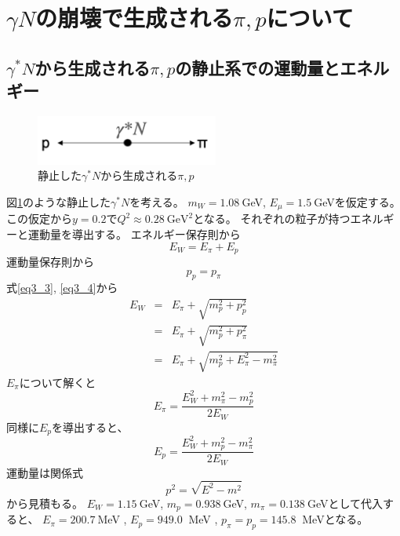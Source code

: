 \section{\texorpdfstring{$\gamma N$の崩壊で生成される$\pi, p$について}{LG}}
\subsection{$\gamma^* N$から生成される$\pi,p$の静止系での運動量とエネルギー}
\begin{figure}[H]
    \centering
    \includegraphics[width=6cm]{img/rest_middle_situation.png}
    \caption{静止した$\gamma^* N$から生成される$\pi,p$}
    \label{fig:angle5}
\end{figure}
図\ref{fig:angle5}のような静止した$\gamma^* N$を考える。
$m_W = 1.08 \ $GeV, $E_\mu = 1.5 \ $GeVを仮定する。
この仮定から$y = 0.2$で$Q^2 \approx 0.28 \ \mathrm{GeV^2}$となる。
それぞれの粒子が持つエネルギーと運動量を導出する。
エネルギー保存則から
\begin{equation}
    \label{eq3_3}
    E_W = E_\pi + E_p
\end{equation}
運動量保存則から
\begin{equation}
    \label{eq3_4}
    p_p = p_\pi
\end{equation}
式\ref{eq3_3}, \ref{eq3_4}から
\begin{eqnarray}
    E_W  & =  & E_\pi + \sqrt{m_p^2 + p_p^2} \\
    & = & E_\pi + \sqrt{m_p^2 + p_\pi^2} \\
    & = & E_\pi + \sqrt{m_p^2 + E_\pi^2 - m_\pi^2}
\end{eqnarray}
$E_\pi$について解くと
\begin{equation}
    E_\pi = \dfrac{E_W ^2 + m_\pi ^2 - m_p ^2}{2E_W}
\end{equation}
同様に$E_p$を導出すると、
\begin{equation}
    E_p = \dfrac{E_W ^2 + m_p ^2 - m_\pi ^2}{2E_W}
\end{equation}
運動量は関係式
\begin{equation}
    p^2 = \sqrt{E^2 - m^2}
\end{equation}
から見積もる。
$E_W = 1.15 \ $GeV, $m_p = 0.938 \ $GeV, $m_\pi = 0.138 \ $GeVとして代入すると、
$E_π = 200.7 \ $MeV , $E_p = 949.0 \ $ MeV , $p_π = p_p = 145.8 \ $ MeVとなる。

